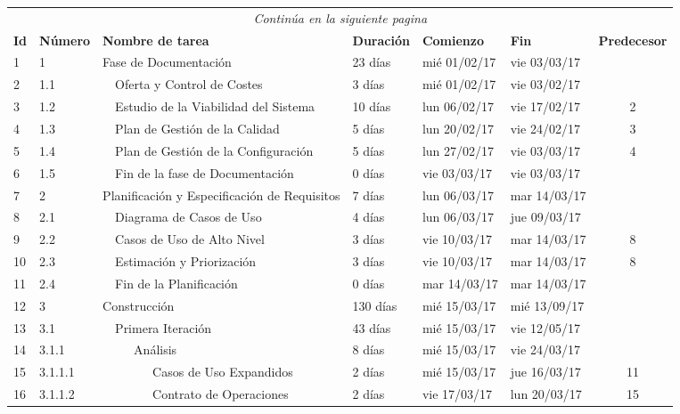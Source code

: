 \begin{center}
\begin{longtable}{  l  l  l  l  l  l  c  }

  \multicolumn{7}{c}{\textit{Continúa en la siguiente pagina}} \\
  \endfoot
  \endlastfoot

	\textbf{Id} & \textbf{Número}  & \textbf{Nombre de tarea} & \textbf{Duración} & \textbf{Comienzo} & \textbf{Fin} & \textbf{Predecesor}  \\ \hline \hline
  1 & 1 & Fase de Documentación & 23 días & mié 01/02/17 & vie 03/03/17 &  \\ \hline
	2 & 1.1 &   Oferta y Control de Costes & 3 días & mié 01/02/17 & vie 03/02/17 &  \\ \hline
	3 & 1.2 &   Estudio de la Viabilidad del Sistema & 10 días & lun 06/02/17 & vie 17/02/17 & 2 \\ \hline
	4 & 1.3 &   Plan de Gestión de la Calidad & 5 días & lun 20/02/17 & vie 24/02/17 & 3 \\ \hline
	5 & 1.4 &   Plan de Gestión de la Configuración & 5 días & lun 27/02/17 & vie 03/03/17 & 4 \\ \hline
	6 & 1.5 &   Fin de la fase de Documentación & 0 días & vie 03/03/17 & vie 03/03/17 &  \\ \hline
	7 & 2 & Planificación y Especificación de Requisitos & 7 días & lun 06/03/17 & mar 14/03/17 &  \\ \hline
	8 & 2.1 &   Diagrama de Casos de Uso & 4 días & lun 06/03/17 & jue 09/03/17 &  \\ \hline
	9 & 2.2 &   Casos de Uso de Alto Nivel & 3 días & vie 10/03/17 & mar 14/03/17 & 8 \\ \hline
	10 & 2.3 &   Estimación y Priorización & 3 días & vie 10/03/17 & mar 14/03/17 & 8 \\ \hline
	11 & 2.4 &   Fin de la Planificación & 0 días & mar 14/03/17 & mar 14/03/17 &  \\ \hline
	12 & 3 & Construcción & 130 días & mié 15/03/17 & mié 13/09/17 &  \\ \hline
	13 & 3.1 &   Primera Iteración & 43 días & mié 15/03/17 & vie 12/05/17 &  \\ \hline
	14 & 3.1.1 &      Análisis & 8 días & mié 15/03/17 & vie 24/03/17 &  \\ \hline
	15 & 3.1.1.1 &         Casos de Uso Expandidos & 2 días & mié 15/03/17 & jue 16/03/17 & 11 \\ \hline
	16 & 3.1.1.2 &         Contrato de Operaciones & 2 días & vie 17/03/17 & lun 20/03/17 & 15 \\ \hline

\end{longtable}
\end{center}
